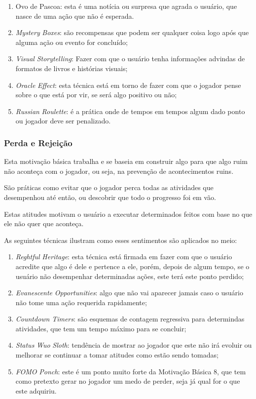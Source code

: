 \begin{enumerate}
    \item Ovo de Pascoa: esta é uma notícia ou surpresa que agrada o usuário,
        que nasce de uma ação que não é esperada.
    \item \textit{Mystery} \textit{Boxes}: são recompensas que podem ser qualquer coisa
        logo após que alguma ação ou evento for concluído;
    \item \textit{Visual} \textit{Storytelling}: Fazer com que o usuário tenha informações
        advindas de formatos de livros e histórias
        visuais;
    \item \textit{Oracle} \textit{Effect}: esta técnica está em torno de fazer com que o
        jogador pense sobre o que está por vir, se será algo positivo ou não;
    \item \textit{Russian} \textit{Roulette}: é a prática onde de tempos em tempos algum dado ponto
        ou jogador deve ser penalizado.
\end{enumerate}

\subsubsection{Perda e Rejeição}
\label{sub:perdaerejeicao}
Esta motivação básica trabalha e se baseia em construir algo para que algo ruim não
aconteça com o jogador, ou seja, na prevenção de acontecimentos ruins.

São práticas como evitar que o jogador perca todas as atividades que desempenhou
até então, ou descobrir que todo o progresso foi em vão.

Estas atitudes motivam o usuário a executar determinados feitos com base no que
ele não quer que aconteça.

As seguintes técnicas ilustram como esses sentimentos são aplicados no meio:

\begin{enumerate}
    \item \textit{Reghtful} \textit{Heritage}: esta técnica está firmada em fazer com que o usuário
        acredite que algo é dele e pertence a ele, porém, depois de algum tempo,
        se o usuário não desempenhar determinadas ações, este terá este ponto
        perdido;
    \item \textit{Evanescente} \textit{Opportunities}: algo que não vai aparecer jamais
        caso o usuário não tome uma ação requerida rapidamente;
    \item \textit{Countdown} \textit{Timers}: são esquemas de contagem regressiva para determindas
        atividades, que tem um tempo máximo para se concluir;
    \item \textit{Status} \textit{Wuo} \textit{Sloth}: tendência de mostrar ao jogador que este não irá evoluir ou melhorar se continuar
        a tomar atitudes como estão sendo tomadas;
    \item \textit{FOMO} \textit{Ponch}: este é um ponto muito forte da Motivação Básica 8, que tem como
        pretexto gerar no jogador um medo de perder, seja já qual for o que
        este adquiriu.
\end{enumerate}

